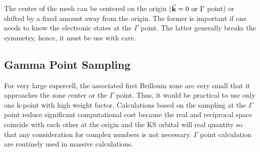 The center of the mesh can be centered on the origin ($\va{k} = 0  \text{ or } \Gamma$ point) or shifted by a fixed amount away from the origin. The former is important if one needs to know the electronic states at the $\Gamma$ point. The latter generally breaks the symmetry, hence, it must be use with care.



\subsection{Gamma Point Sampling}
For very large supercell, the associated first Brillouin zone are very small that it approaches the zone center or the $\Gamma$ point. Thus, it would be practical to use only one k-point  with high weight factor. Calculations based on the sampling at the $\Gamma$ point reduce significant computational cost because the real and reciprocal space coincide with each  other at the origin and the KS orbital will real quantity so that any consideration for complex numbers is not necessary. $\Gamma$ point calculation are routinely used in massive calculations.


